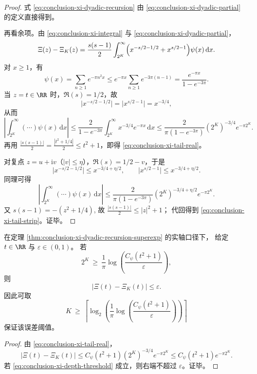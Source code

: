 \begin{proof}
式 \eqref{eq:conclusion-xi-dyadic-recursion} 由 \eqref{eq:conclusion-xi-dyadic-partial} 的定义直接得到。

再看余项。由 \eqref{eq:conclusion-xi-integral} 与 \eqref{eq:conclusion-xi-dyadic-partial}，
\[
\Xi(z)-\Xi_K(z)
=
\frac{s(s-1)}{2}\int_{2^K}^{\infty}
\Bigl(x^{-s/2-1/2}+x^{s/2-1}\Bigr)\psi(x)\,\mathrm{d}x.
\]
对 \(x\ge 1\)，有
\[
\psi(x)=\sum_{n\ge 1}e^{-\pi n^2x}
\le e^{-\pi x}\sum_{n\ge 1}e^{-3\pi(n-1)}
=\frac{e^{-\pi x}}{1-e^{-3\pi}}.
\]
当 \(z=t\in\RR\) 时，\(\Re(s)=1/2\)，故
\[
\bigl|x^{-s/2-1/2}\bigr|=\bigl|x^{s/2-1}\bigr|=x^{-3/4},
\]
从而
\[
\left|\int_{2^K}^{\infty}(\cdots)\psi(x)\,\mathrm{d}x\right|
\le
\frac{2}{1-e^{-3\pi}}\int_{2^K}^{\infty}x^{-3/4}e^{-\pi x}\,\mathrm{d}x
\le
\frac{2}{\pi(1-e^{-3\pi})}(2^K)^{-3/4}e^{-\pi 2^K}.
\]
再用 \(\frac{|s(s-1)|}{2}=\frac{|t^2+1/4|}{2}\le t^2+1\)，即得
\eqref{eq:conclusion-xi-tail-real}。

对复点 \(z=u+\mathrm{i}v\)（\(|v|\le \eta\)），\(\Re(s)=1/2-v\)，于是
\[
\bigl|x^{-s/2-1/2}\bigr|\le x^{-3/4+\eta/2},
\qquad
\bigl|x^{s/2-1}\bigr|\le x^{-3/4+\eta/2}.
\]
同理可得
\[
\left|\int_{2^K}^{\infty}(\cdots)\psi(x)\,\mathrm{d}x\right|
\le
\frac{2}{\pi(1-e^{-3\pi})}(2^K)^{-3/4+\eta/2}e^{-\pi 2^K}.
\]
又
\(
s(s-1)=-(z^2+1/4)
\),
故 \(\frac{|s(s-1)|}{2}\le |z|^2+1\)；
代回得到 \eqref{eq:conclusion-xi-tail-strip}。证毕。
\end{proof}

\begin{corollary}[误差阈值下的双对数尺度深度律]\label{cor:conclusion-xi-dyadic-depth-law}
在定理 \ref{thm:conclusion-xi-dyadic-recursion-superexp} 的实轴口径下，
给定 \(t\in\RR\) 与 \(\varepsilon\in(0,1)\)。
若
\begin{equation}\label{eq:conclusion-xi-depth-threshold}
2^K\ \ge\ \frac1\pi\log\!\left(\frac{C_{\psi}(t^2+1)}{\varepsilon}\right),
\end{equation}
则
\[
|\Xi(t)-\Xi_K(t)|\le \varepsilon.
\]
因此可取
\[
K\ \ge\
\left\lceil
\log_2\!\left(
\frac1\pi\log\!\left(\frac{C_{\psi}(t^2+1)}{\varepsilon}\right)
\right)
\right\rceil
\]
保证该误差阈值。
\end{corollary}
\begin{proof}
由 \eqref{eq:conclusion-xi-tail-real}，
\[
|\Xi(t)-\Xi_K(t)|
\le
C_{\psi}(t^2+1)(2^K)^{-3/4}e^{-\pi 2^K}
\le
C_{\psi}(t^2+1)e^{-\pi 2^K}.
\]
若 \eqref{eq:conclusion-xi-depth-threshold} 成立，则右端不超过 \(\varepsilon\)。证毕。
\end{proof}

